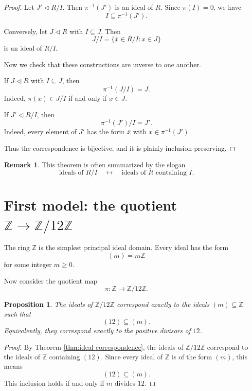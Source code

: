 \documentclass[11pt]{article}
\newtheorem{proposition}[theorem]{Proposition}
\theoremstyle{definition}
\newtheorem{remark}[theorem]{Remark}
\newcommand{\Z}{\mathbb{Z}}
\newcommand{\ol}[1]{\overline{#1}}
\begin{document}
	\begin{proof}
		Let $J' \triangleleft R/I$. Then $\pi^{-1}(J')$ is an ideal of $R$. Since $\pi(I)=0$, we have
		\[
		I \subseteq \pi^{-1}(J').
		\]
		
		Conversely, let $J \triangleleft R$ with $I\subseteq J$. Then
		\[
		J/I=\{\ol{x}\in R/I : x\in J\}
		\]
		is an ideal of $R/I$.
		
		Now we check that these constructions are inverse to one another.
		
		If $J \triangleleft R$ with $I\subseteq J$, then
		\[
		\pi^{-1}(J/I)=J.
		\]
		Indeed, $\pi(x)\in J/I$ if and only if $x\in J$.
		
		If $J' \triangleleft R/I$, then
		\[
		\pi^{-1}(J')/I=J'.
		\]
		Indeed, every element of $J'$ has the form $\ol{x}$ with $x\in \pi^{-1}(J')$.
		
		Thus the correspondence is bijective, and it is plainly inclusion-preserving. 
	\end{proof}
	
	\begin{remark}
		This theorem is often summarized by the slogan
		\[
		\text{ideals of }R/I
		\quad\leftrightarrow\quad
		\text{ideals of }R\text{ containing }I.
		\]
	\end{remark}
	
	\section{First model: the quotient $\Z \to \Z/12\Z$}
	
	The ring $\Z$ is the simplest principal ideal domain. Every ideal has the form
	\[
	(m)=m\Z
	\]
	for some integer $m\ge 0$.
	
	Now consider the quotient map
	\[
	\pi:\Z\longrightarrow \Z/12\Z.
	\]
	
	\begin{proposition}
		The ideals of $\Z/12\Z$ correspond exactly to the ideals $(m)\subseteq \Z$ such that
		\[
		(12)\subseteq (m).
		\]
		Equivalently, they correspond exactly to the positive divisors of $12$.
	\end{proposition}
	
	\begin{proof}
		By Theorem \ref{thm:ideal-correspondence}, the ideals of $\Z/12\Z$ correspond to the ideals of $\Z$ containing $(12)$. Since every ideal of $\Z$ is of the form $(m)$, this means
		\[
		(12)\subseteq (m).
		\]
		This inclusion holds if and only if $m$ divides $12$.
	\end{proof}
	
\end{document}
